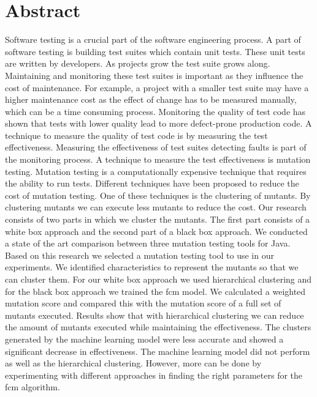 \documentclass[../main]{subfiles}
\begin{document}
\chapter*{Abstract}
Software testing is a crucial part of the software engineering process. 
A part of software testing is building test suites which contain unit tests.
These unit tests are written by developers. 
As projects grow the test suite grows along.
Maintaining and monitoring these test suites is important as they influence the cost of maintenance.
For example, a project with a smaller test suite may have a higher maintenance cost as the effect of change has to be measured manually, which can be a time consuming process.
Monitoring the quality of test code has shown that tests with lower quality lead to more defect-prone production code.
A technique to measure the quality of test code is by measuring the test effectiveness.
\newline
Measuring the effectiveness of test suites detecting faults is part of the monitoring process.
A technique to measure the test effectiveness is mutation testing.
Mutation testing is a computationally expensive technique that requires the ability to run tests.
Different techniques have been proposed to reduce the cost of mutation testing.
One of these techniques is the clustering of mutants.
By clustering mutants we can execute less mutants to reduce the cost.
\newline
Our research consists of two parts in which we cluster the mutants.
The first part consists of a white box approach and the second part of a black box approach.
We conducted a state of the art comparison between three mutation testing tools for Java.
Based on this research we selected a mutation testing tool to use in our experiments.
\newline
We identified characteristics to represent the mutants so that we can cluster them.
For our white box approach we used hierarchical clustering and for the black box approach we trained the \acrlong{fcm} model.
We calculated a weighted mutation score and compared this with the mutation score of a full set of mutants executed.
Results show that with hierarchical clustering we can reduce the amount of mutants executed while maintaining the effectiveness.
The clusters generated by the machine learning model were less accurate and showed a significant decrease in effectiveness.
The machine learning model did not perform as well as the hierarchical clustering.
However, more can be done by experimenting with different approaches in finding the right parameters for the \acrlong{fcm} algorithm. 
\end{document}
